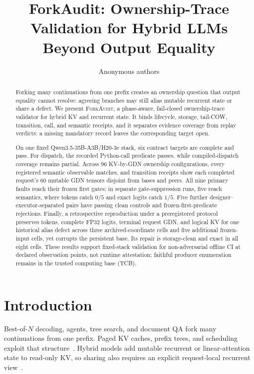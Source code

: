 \documentclass{article}
\title{ForkAudit: Ownership-Trace Validation for Hybrid LLMs Beyond Output Equality}
\author{Anonymous authors}
\newcommand{\method}{\textsc{ForkAudit}}
\begin{document}
\raggedbottom
\maketitle

\begin{abstract}
Forking many continuations from one prefix creates an ownership question that
output equality cannot resolve: agreeing branches may still alias mutable
recurrent state or share a defect.  We present \method{}, a phase-aware,
fail-closed ownership-trace validator for hybrid KV and recurrent state.  It
binds lifecycle, storage, tail-COW, transition, call, and semantic receipts,
and it separates evidence coverage from replay verdicts: a missing mandatory
record leaves the corresponding target open.

On one fixed Qwen3.5-35B-A3B/H20-3e stack, six contract targets are complete
and pass.  For dispatch, the recorded Python-call predicate passes, while
compiled-dispatch coverage remains partial.  Across 96 KV-by-GDN ownership
configurations, every registered semantic observable matches, and transition
receipts show each completed request's 60 mutable GDN tensors disjoint from
bases and peers.  All nine primary faults reach their frozen first gates; in
separate gate-suppression runs, five reach semantics, where tokens catch $0/5$
and exact logits catch $1/5$.  Five further designer--executor-separated pairs
have passing clean controls and frozen-first-predicate rejections.  Finally, a
retrospective reproduction under a preregistered protocol preserves tokens,
complete FP32 logits, terminal request GDN, and logical KV for one historical
alias defect across three archived-coordinate cells and five additional
frozen-input cells, yet corrupts the persistent base.  Its repair is
storage-clean and exact in all eight cells.  These results support fixed-stack
validation for non-adversarial offline CI at declared observation points, not
runtime attestation; faithful producer enumeration remains in the trusted
computing base (TCB).
\end{abstract}

\section{Introduction}
\label{sec:intro}

Best-of-$N$ decoding, agents, tree search, and document QA fork many
continuations from one prefix.  Paged KV caches, prefix trees, and scheduling
exploit that structure~\citep{kwon2023pagedattention,zheng2024sglang,
gim2024promptcache,srivatsa2025preble}.  Hybrid models add mutable recurrent or
linear-attention state to read-only KV, so sharing also requires an explicit
request-local recurrent view~\citep{yang2025gateddeltanet,lieber2025jamba,
pan2025marconi}.
\end{document}
